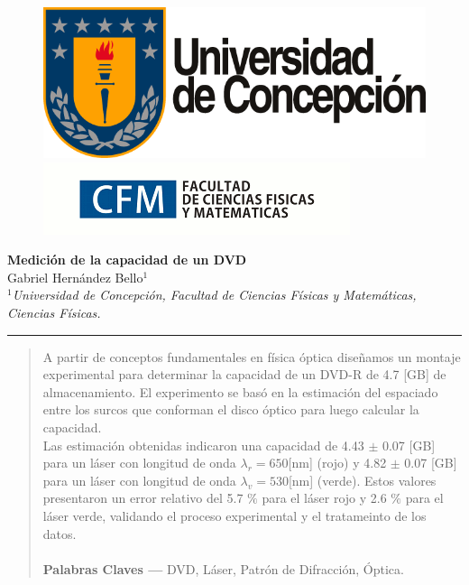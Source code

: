 \documentclass[10pt,a4paper]{article}
\author{Gabriel Hernandez Bello}
\begin{document}
	
	\begin{figure}[H]
		\raggedright
		\includegraphics[scale=0.2]{../Altura-Campanil/IMG/logo_udec.png} \hfill \includegraphics[scale=0.5]{../Altura-Campanil/IMG/cfm_logo.png}
	\end{figure}

	\vspace{6mm}
	\begin{center}
		{\Large \textbf{Medición de la capacidad de un DVD}}\\
		\vspace{2mm}
		{\large Gabriel Hernández Bello$^{1}$}\\
		\vspace{6.5mm}
		$^1$\textit{Universidad de Concepción, Facultad de Ciencias Físicas y Matemáticas, Ciencias Físicas. }\\
	\end{center}

	\begin{center}
		\textcolor{pinegreen}{\rule{150mm}{0.8mm}}
	\end{center}

	\begin{abstract}
	A partir de conceptos fundamentales en física óptica diseñamos un montaje experimental para determinar la capacidad de un DVD-R de 4.7 [GB] de almacenamiento. El experimento se basó en la estimación del espaciado entre los surcos que conforman el disco óptico para luego calcular la capacidad.\\
	Las estimación obtenidas indicaron una  capacidad de 4.43 $\pm$ 0.07 [GB] para un láser  con longitud de onda $\lambda_r = 650$[nm]  (rojo) y  4.82 $\pm$ 0.07 [GB]  para un láser con longitud de onda $\lambda_v = 530$[nm] (verde). Estos valores presentaron un error relativo del 5.7 $\%$  para el láser rojo y 2.6 $\%$ para el láser verde, validando el proceso experimental y el tratameinto de los datos.\\
	\\
		\textbf{Palabras Claves ---}  DVD, Láser, Patrón de Difracción, Óptica.
	\end{abstract}
	
\end{document}
